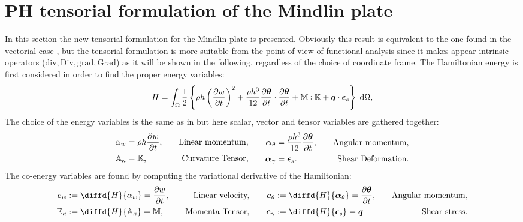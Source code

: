 \documentclass[preprint,12pt]{elsarticle}
\newcommand{\secondReviewer}[1]{\textcolor{blue!80!black}{#1}}
\def\onedot{$\mathsurround0pt\ldotp$}
\def\cddot{%
	\mathbin{\vcenter{\baselineskip.67ex
			\hbox{\onedot}\hbox{\onedot}}%
}}
\begin{document}
\section{PH tensorial formulation of the Mindlin plate}
\label{sec:PH_ten_Min}
In this section the new tensorial formulation for the Mindlin plate is presented. \secondReviewer{Obviously this result is equivalent to the one found in the vectorial case \cite{MacchelliMindlin}, but the tensorial formulation is more suitable from the point of view of functional analysis since it makes appear intrinsic operators ($\mathrm{div}, \mathrm{Div}, \mathrm{grad}, \mathrm{Grad}$) as it will be shown in the following, regardless of the choice of coordinate frame. \newline
The Hamiltonian energy is first considered in order to find the proper energy variables:
\begin{equation}
\label{eq:H_min}
H = \int_{\Omega} \frac{1}{2} \left\{ \rho h \left(\diffp{w}{t} \right)^2 + \frac{\rho h^3}{12} \diffp{\bm{\theta}}{t} \cdot   \diffp{\bm{\theta}}{t} +   \mathbb{M} \cddot \mathbb{K} + \bm{q} \cdot \bm{\epsilon}_s  \right\}  \d\Omega, 
\end{equation}
The choice of the energy variables is the same as in \cite{MacchelliMindlin} but here scalar,}  vector and tensor variables are gathered together:
\begin{equation}
\begin{aligned}
\alpha_w &= \rho h \diffp{w}{t}, \quad &\text{Linear momentum,} \\
\mathbb{A}_{\kappa} &= \mathbb{K}, \quad &\text{Curvature Tensor,} \\
\end{aligned} \qquad
\begin{aligned}
\bm\alpha_{\theta} &=  \frac{\rho h^3}{12} \diffp{\bm{\theta}}{t}, \quad &\text{Angular momentum,}\\
\bm\alpha_{\gamma} &= \bm{\epsilon}_s. \quad &\text{Shear Deformation.}\\
\end{aligned}
\end{equation}
The co-energy variables are found by computing the variational derivative of the Hamiltonian:
\begin{equation}
\begin{aligned}
e_w &:= \diffd{H}{\alpha_w} = \diffp{w}{t},  \quad &\text{Linear velocity,} \\
\mathbb{E}_{\kappa} &:= \diffd{H}{\mathbb{A}_{\kappa}} = \mathbb{M}, \quad &\text{Momenta Tensor,}\\
\end{aligned} \qquad
\begin{aligned}
\bm{e}_{\theta} &:= \diffd{H}{\bm\alpha_{\theta}} = \diffp{\bm{\theta}}{t}, \quad &\text{Angular momentum,}  \\
\bm{e}_{\gamma} &:= \diffd{H}{\bm{\epsilon}_s} = \bm{q} \quad &\text{Shear stress.} \\
\end{aligned}
\end{equation}
\end{document}
